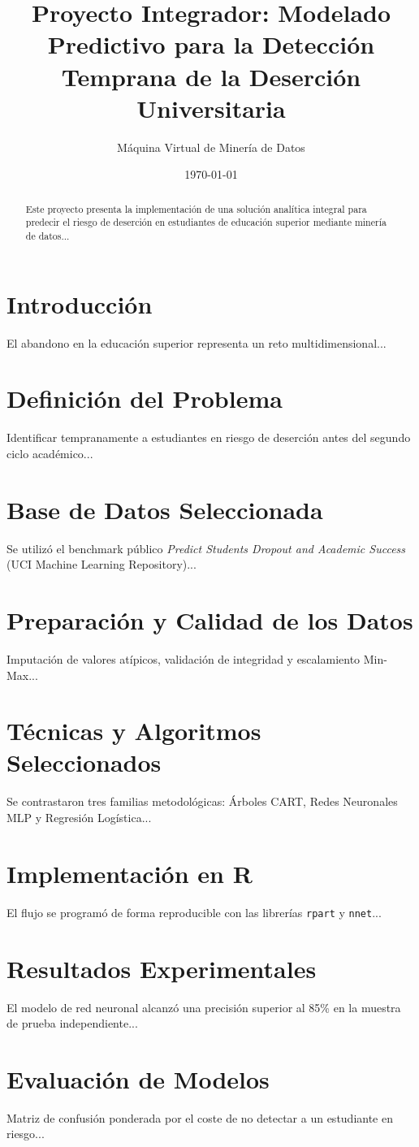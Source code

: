 \documentclass[11pt,a4paper]{article}
\title{\textbf{Proyecto Integrador: Modelado Predictivo para la Detección Temprana de la Deserción Universitaria}}
\author{Máquina Virtual de Minería de Datos}
\date{\today}
\begin{document}
\maketitle
\begin{abstract}
Este proyecto presenta la implementación de una solución analítica integral para predecir el riesgo de deserción en estudiantes de educación superior mediante minería de datos...
\end{abstract}
\section{Introducción}
El abandono en la educación superior representa un reto multidimensional...
\section{Definición del Problema}
Identificar tempranamente a estudiantes en riesgo de deserción antes del segundo ciclo académico...
\section{Base de Datos Seleccionada}
Se utilizó el benchmark público \textit{Predict Students Dropout and Academic Success} (UCI Machine Learning Repository)...
\section{Preparación y Calidad de los Datos}
Imputación de valores atípicos, validación de integridad y escalamiento Min-Max...
\section{Técnicas y Algoritmos Seleccionados}
Se contrastaron tres familias metodológicas: Árboles CART, Redes Neuronales MLP y Regresión Logística...
\section{Implementación en R}
El flujo se programó de forma reproducible con las librerías \texttt{rpart} y \texttt{nnet}...
\section{Resultados Experimentales}
El modelo de red neuronal alcanzó una precisión superior al 85\% en la muestra de prueba independiente...
\section{Evaluación de Modelos}
Matriz de confusión ponderada por el coste de no detectar a un estudiante en riesgo...
\end{document}
